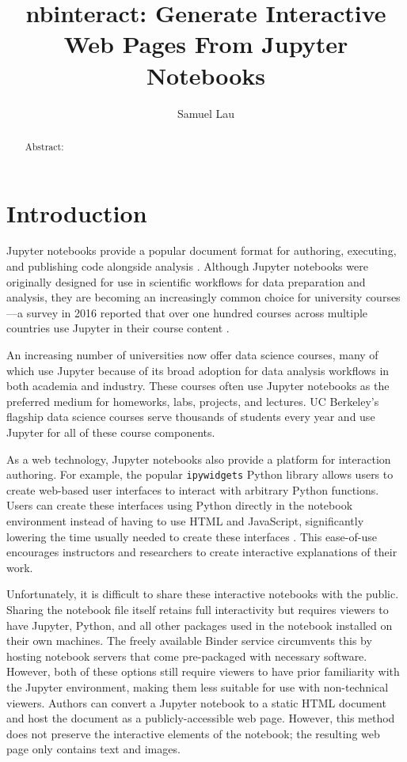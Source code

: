 \documentclass[nobib]{tufte-handout}
\title{nbinteract: Generate Interactive Web Pages From Jupyter Notebooks}
\author[Samuel Lau]{Samuel Lau}
\newcommand{\code}[1]{\texttt{#1}}
\begin{document}
\maketitle%

\begin{abstract}
\noindent
Abstract:
\end{abstract}

\section{Introduction} %
\label{sec:introduction}

Jupyter notebooks provide a popular document format for authoring, executing,
and publishing code alongside analysis \cite{thomas_jupyter_2016}. Although
Jupyter notebooks were originally designed for use in scientific workflows for
data preparation and analysis, they are becoming an increasingly common choice
for university courses---a survey in 2016 reported that over one hundred
courses across multiple countries use Jupyter in their course content
\cite{hamrick_2016_2016}.

An increasing number of universities now offer data science courses, many of
which use Jupyter because of its broad adoption for data analysis workflows in
both academia and industry. These courses often use Jupyter notebooks as the
preferred medium for homeworks, labs, projects, and lectures. UC Berkeley's
flagship data science courses serve thousands of students every year and use
Jupyter for all of these course components.

As a web technology, Jupyter notebooks also provide a platform for interaction
authoring. For example, the popular \code{ipywidgets} Python library allows
users to create web-based user interfaces to interact with arbitrary Python
functions. Users can create these interfaces using Python directly in the
notebook environment instead of having to use HTML and JavaScript,
significantly lowering the time usually needed to create these interfaces
\cite{_jupyter-widgets/ipywidgets_}. This ease-of-use encourages instructors
and researchers to create interactive explanations of their work.

Unfortunately, it is difficult to share these interactive notebooks with the
public. Sharing the notebook file itself retains full interactivity but
requires viewers to have Jupyter, Python, and all other packages used in the
notebook installed on their own machines. The freely available Binder service
circumvents this by hosting notebook servers that come pre-packaged with
necessary software. However, both of these options still require viewers to
have prior familiarity with the Jupyter environment, making them less suitable
for use with non-technical viewers. Authors can convert a Jupyter notebook to a
static HTML document and host the document as a publicly-accessible web page.
However, this method does not preserve the interactive elements of the
notebook; the resulting web page only contains text and images.
\end{document}
